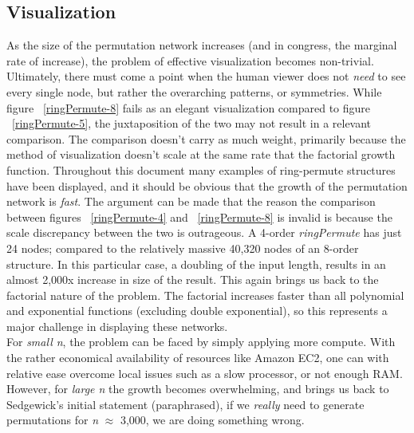 \documentclass[12pt]{article}
\begin{document}
\subsection{Visualization}
As the size of the permutation network increases (and in congress, the marginal rate of increase), the problem of effective visualization becomes non-trivial.
Ultimately, there must come a point when the human viewer does not \emph{need} to see every single node, but rather the overarching patterns, or symmetries.
While figure ~\ref{ringPermute-8} fails as an elegant visualization compared to figure ~\ref{ringPermute-5}, the juxtaposition of the two may not result in a relevant comparison.
The comparison doesn't carry as much weight, primarily because the method of visualization doesn't scale at the same rate that the factorial growth function. \pagebreak[2]
Throughout this document many examples of ring-permute structures have been displayed, and it should be obvious that the growth of the permutation network is \emph{fast}.
The argument can be made that the reason the comparison between figures ~\ref{ringPermute-4} and ~\ref{ringPermute-8} is invalid is because the scale discrepancy between the two is outrageous.
A 4-order \emph{ringPermute} has just 24 nodes; compared to the relatively massive 40,320 nodes of an 8-order structure.
In this particular case, a doubling of the input length, results in an almost 2,000x increase in size of the result.
This again brings us back to the factorial nature of the problem.
The factorial increases faster than all polynomial and exponential functions (excluding double exponential), so this represents a major challenge in displaying these networks.\\
For \emph{small n}, the problem can be faced by simply applying more compute. With the rather economical availability of resources like Amazon EC2, one can with relative ease overcome local issues such as a slow processor, or not enough RAM.
However, for \emph{large n} the growth becomes overwhelming, and brings us back to Sedgewick's initial statement (paraphrased), if we \emph{really} need to generate permutations for \emph{n} $\approx$ 3,000, we are doing something wrong.\\

\newpage
\onehalfspacing
{}





\newpage
\end{document}
